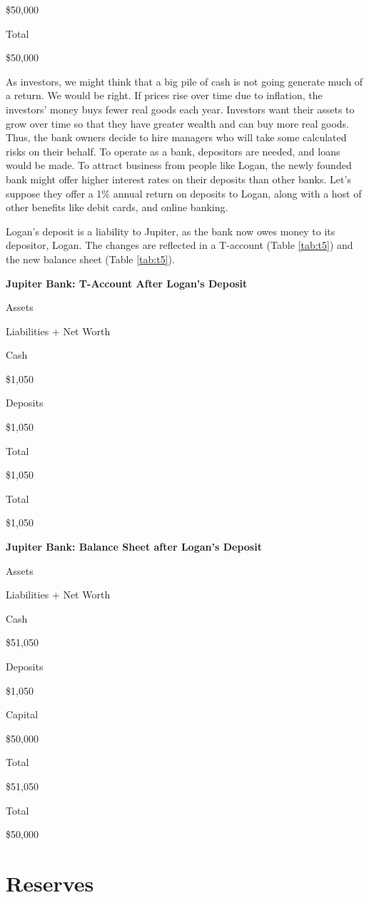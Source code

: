 \documentclass[
]{book}
\begin{document}
\$50,000

Total

\$50,000

As investors, we might think that a big pile of cash is not going generate much of a return. We would be right. If prices rise over time due to inflation, the investors' money buys fewer real goods each year. Investors want their assets to grow over time so that they have greater wealth and can buy more real goods. Thus, the bank owners decide to hire managers who will take some calculated risks on their behalf. To operate as a bank, depositors are needed, and loans would be made. To attract business from people like Logan, the newly founded bank might offer higher interest rates on their deposits than other banks. Let's suppose they offer a 1\% annual return on deposits to Logan, along with a host of other benefits like debit cards, and online banking.

Logan's deposit is a liability to Jupiter, as the bank now owes money to its depositor, Logan. The changes are reflected in a T-account (Table \ref{tab:t5}) and the new balance sheet (Table \ref{tab:t5}).

\label{tab:t5}\textbf{Jupiter Bank: T-Account After Logan's Deposit}

Assets

Liabilities + Net Worth

Cash

\$1,050

Deposits

\$1,050

Total

\$1,050

Total

\$1,050

\label{tab:t6}\textbf{Jupiter Bank: Balance Sheet after Logan's Deposit}

Assets

Liabilities + Net Worth

Cash

\$51,050

Deposits

\$1,050

Capital

\$50,000

Total

\$51,050

Total

\$50,000

\hypertarget{reserves}{%
\section{Reserves}\label{reserves}}
\end{document}
